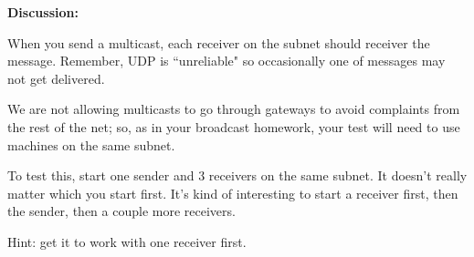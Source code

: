 {\bf Discussion:}

When you send a multicast, each receiver on the subnet should
receiver the message.
Remember, UDP is ``unreliable" so occasionally one
of messages may not get delivered.

We are not allowing multicasts to go through gateways to avoid
complaints from the rest of the net; so, as in your broadcast homework,
your test will need to use machines on the same subnet.

To test this, start one sender and 3 receivers on the same subnet.
It doesn't really matter which you start first.
It's kind of interesting to start a receiver first, then the
sender, then a couple more receivers.

Hint: get it to work with one receiver first.
\bye
